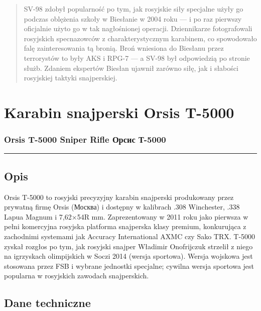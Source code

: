 \documentclass[12pt,openany,oneside]{book}
\begin{document}
\begin{quote}
SV-98 zdobył popularność po tym, jak rosyjskie siły specjalne użyły go
podczas oblężenia szkoły w Biesłanie w 2004 roku --- i po raz pierwszy
oficjalnie użyto go w tak nagłośnionej operacji. Dziennikarze
fotografowali rosyjskich specnazowców z charakterystycznym karabinem, co
spowodowało falę zainteresowania tą bronią. Broń wniesiona do Biesłanu
przez terrorystów to były AKS i RPG-7 --- a SV-98 był odpowiedzią po
stronie służb. Zdaniem ekspertów Biesłan ujawnił zarówno siłę, jak i
słabości rosyjskiej taktyki snajperskiej.
\end{quote}

\chapter{Karabin snajperski Orsis
T-5000}\label{karabin-snajperski-orsis-t-5000}

\subsection{Orsis T-5000 Sniper Rifle \textbar{} Орсис
Т-5000}\label{orsis-t-5000-sniper-rifle-ux43eux440ux441ux438ux441-ux442-5000}

\begin{center}\rule{0.5\linewidth}{0.5pt}\end{center}

\section{Opis}\label{opis-64}

Orsis T-5000 to rosyjski precyzyjny karabin snajperski produkowany przez
prywatną firmę Orsis (Москва) i dostępny w kalibrach .308 Winchester,
.338 Lapua Magnum i 7,62×54R mm. Zaprezentowany w 2011 roku jako
pierwsza w pełni komercyjna rosyjska platforma snajperska klasy premium,
konkurująca z zachodnimi systemami jak Accuracy International AXMC czy
Sako TRX. T-5000 zyskał rozgłos po tym, jak rosyjski snajper Władimir
Onofrijczuk strzelił z niego na igrzyskach olimpijskich w Soczi 2014
(wersja sportowa). Wersja wojskowa jest stosowana przez FSB i wybrane
jednostki specjalne; cywilna wersja sportowa jest popularna w rosyjskich
zawodach snajperskich.

\section{Dane techniczne}\label{dane-techniczne-64}
\end{document}
